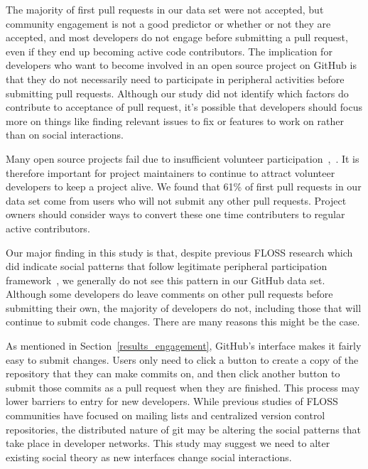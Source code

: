 \documentclass{iitthesis}
\begin{document}
The majority of first pull requests in our data set were not accepted, but
community engagement is not a good predictor or whether or not they are
accepted, and most developers do not engage before submitting a pull request,
even if they end up becoming active code contributors. The implication for
developers who want to become involved in an open source project on GitHub is
that they do not necessarily need to participate in peripheral activities before
submitting pull requests. Although our study did not identify which factors do
contribute to acceptance of pull request, it's possible that developers should
focus more on things like finding relevant issues to fix or features to work on
rather than on social interactions.

Many open source projects fail due to insufficient volunteer
participation~\cite{crowston_defining_2003},~\cite{krishnamurthy_cave_2002}. It
is therefore important for project maintainers to continue to attract volunteer
developers to keep a project alive. We found that 61\% of first pull requests
in our data set come from users who will not submit any other pull requests.
Project owners should consider ways to convert these one time contributers to
regular active contributors.

Our major finding in this study is that, despite previous FLOSS research which
did indicate social patterns that follow legitimate peripheral participation
framework~\cite{ducheneaut_socialization_2005, huang_mining_2005, ye_toward_2003},
we generally do not see this pattern in our GitHub data set. Although some
developers do leave comments on other pull requests before submitting their own,
the majority of developers do not, including those that will continue to submit
code changes. There are many reasons this might be the case.

As mentioned in Section~\ref{results_engagement}, GitHub's interface makes it
fairly easy to submit changes. Users only need to click a button to create a
copy of the repository that they can make commits on, and then click another
button to submit those commits as a pull request when they are finished. This
process may lower barriers to entry for new developers. While previous studies
of FLOSS communities have focused on mailing lists and centralized version
control repositories, the distributed nature of git may be altering the social
patterns that take place in developer networks. This study may suggest we need
to alter existing social theory as new interfaces change social interactions.
\end{document}
